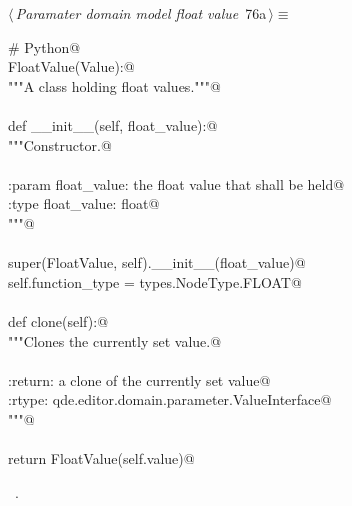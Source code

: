 \documentclass[
    a4paper,      %
    10pt,         %
    openright,    %
    notitlepage,  %
    parskip=half, %
]{scrreprt}       %
\theoremstyle{definition}                    %
\begin{document}
\begin{flushleft} \small
\begin{minipage}{\linewidth}\label{scrap122}\raggedright\small
{} $\langle\,${\itshape Paramater domain model float value}\nobreak\ {\footnotesize {76a}}$\,\rangle\equiv$
\vspace{-1exm}
\begin{list}{}{} \item
\mbox{}\lstinline@# Python@\\
\mbox{}\lstinline@class FloatValue(Value):@\\
\mbox{}\lstinline@    """A class holding float values."""@\\
\mbox{}\lstinline@@\\
\mbox{}\lstinline@    def __init__(self, float_value):@\\
\mbox{}\lstinline@        """Constructor.@\\
\mbox{}\lstinline@@\\
\mbox{}\lstinline@        :param float_value: the float value that shall be held@\\
\mbox{}\lstinline@        :type  float_value: float@\\
\mbox{}\lstinline@        """@\\
\mbox{}\lstinline@@\\
\mbox{}\lstinline@        super(FloatValue, self).__init__(float_value)@\\
\mbox{}\lstinline@        self.function_type = types.NodeType.FLOAT@\\
\mbox{}\lstinline@@\\
\mbox{}\lstinline@    def clone(self):@\\
\mbox{}\lstinline@        """Clones the currently set value.@\\
\mbox{}\lstinline@@\\
\mbox{}\lstinline@        :return: a clone of the currently set value@\\
\mbox{}\lstinline@        :rtype:  qde.editor.domain.parameter.ValueInterface@\\
\mbox{}\lstinline@        """@\\
\mbox{}\lstinline@@\\
\mbox{}\lstinline@        return FloatValue(self.value)@{\NWsep}
\end{list}
\vspace{-1.5ex}
\footnotesize
\begin{list}{}{\setlength{\itemsep}{-\parsep}\setlength{\itemindent}{-\leftmargin}}
\item \NWtxtMacroRefIn\ .

\item{}
\end{list}
\end{minipage}\vspace{4ex}
\end{flushleft}
\end{document}
